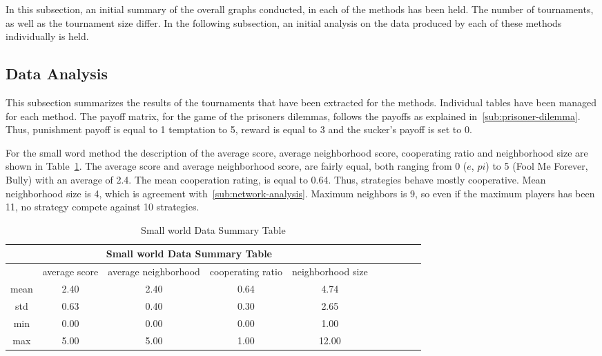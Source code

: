 In this subsection, an initial summary of the overall graphs conducted, in
each of the methods has been held. The number of tournaments, as well as the
tournament size differ. In the following subsection, an initial analysis on the
data produced by each of these methods individually is held.

\subsection{Data Analysis}
This subsection summarizes the results of the tournaments that have been extracted
for the methods.
Individual tables have been managed for each method. The payoff matrix, for
the game of the prisoners dilemmas, follows the payoffs as explained in~\autoref{sub:prisoner-dilemma}.
Thus, punishment payoff is equal to 1 temptation to 5, reward is equal to 3 and
the sucker's payoff is set to 0.

For the small word method the description of the average score, average
neighborhood score, cooperating ratio and neighborhood size are shown in
Table~\ref{table:summary-small-data}. The average score and average
neighborhood score, are fairly equal, both ranging from 0 ($e$, $pi$) to 5 (Fool Me Forever, Bully)
with an average of 2.4. The mean cooperation rating, is equal to 0.64. Thus, strategies behave mostly cooperative.
Mean neighborhood size is 4, which is agreement with~\autoref{sub:network-analysis}.
Maximum neighbors is 9, so even if the maximum players has been 11, no strategy
compete against 10 strategies.

\begin{table}[!hbtp]
	\centering
	\begin{adjustbox}{width=0.8\textwidth}
		\small
		\begin{tabular}{cccccccccc}
				\toprule
			\multicolumn{5}{|c|}{Small world Data Summary Table}                                \\ \hline
			     & average score & average neighborhood & cooperating ratio & neighborhood size \\ \hline
			mean & 2.40          & 2.40                 & 0.64              & 4.74              \\ \hline
			std  & 0.63          & 0.40                 & 0.30              & 2.65              \\ \hline
			min  & 0.00          & 0.00                 & 0.00              & 1.00              \\ \hline
			max  & 5.00          & 5.00                 & 1.00              & 12.00             \\ \bottomrule
		\end{tabular}
	\end{adjustbox}
	\caption{Small world Data Summary Table}
	\label{table:summary-small-data}
\end{table}

